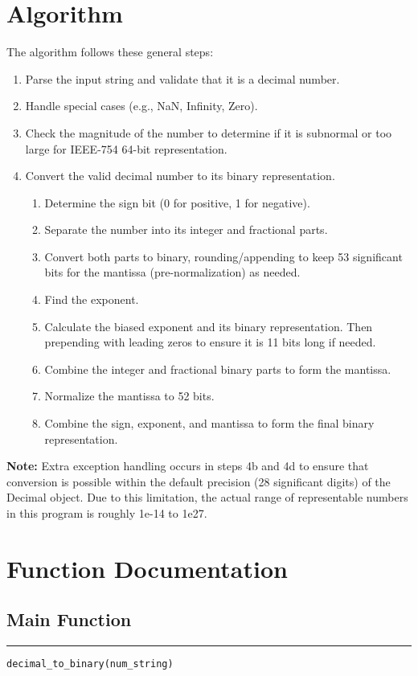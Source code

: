 \documentclass[12pt]{article}
\begin{document}
\section*{Algorithm}
The algorithm follows these general steps:
\begin{enumerate}
    \item Parse the input string and validate that it is a decimal number.
    \item Handle special cases (e.g., NaN, Infinity, Zero).
    \item Check the magnitude of the number to determine if it is subnormal or too large for IEEE-754 64-bit representation.
    \item Convert the valid decimal number to its binary representation.
    \begin{enumerate}
        \item Determine the sign bit (0 for positive, 1 for negative).
        \item Separate the number into its integer and fractional parts.
        \item Convert both parts to binary, rounding/appending to keep 53 significant bits for the mantissa (pre-normalization) as needed.
        \item Find the exponent.
        \item Calculate the biased exponent and its binary representation. Then prepending with leading zeros to ensure it is 11 bits long if needed.
        \item Combine the integer and fractional binary parts to form the mantissa.
        \item Normalize the mantissa to 52 bits.
        \item Combine the sign, exponent, and mantissa to form the final binary representation.
    \end{enumerate}
\end{enumerate}
\textbf{Note:} Extra exception handling occurs in steps 4b and 4d to ensure that conversion is possible within the default precision (28 significant digits) of the Decimal object. Due to this limitation, the actual range of representable numbers in this program is roughly 1e-14 to 1e27.

\section*{Function Documentation}
\subsection*{Main Function\\} 
\hrule
{\large\texttt{decimal\_to\_binary(num\_string)}}
\end{document}
